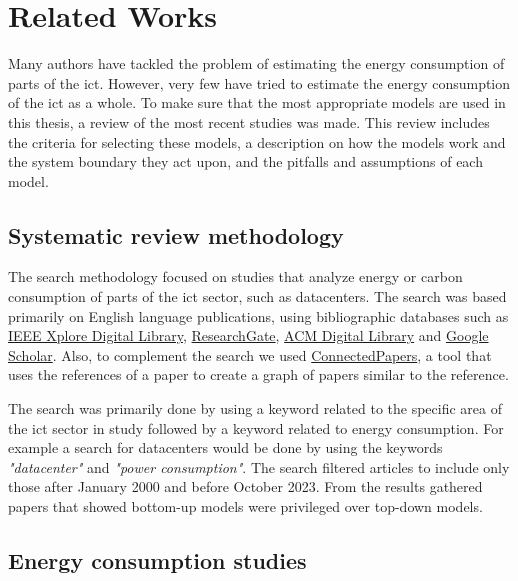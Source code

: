\chapter{Related Works}
\label{chapter:related_works}

\begin{introduction}
    Many authors have tackled the problem of estimating the energy consumption of parts of the \ac{ict}. However, very few have tried to estimate the energy consumption of the \ac{ict} as a whole. To make sure that the most appropriate models are used in this thesis, a review of the most recent studies was made. This review includes the criteria for selecting these models, a description on how the models work and the system boundary they act upon, and the pitfalls and assumptions of each model.
\end{introduction}

\section{Systematic review methodology}

The search methodology focused on studies that analyze energy or carbon consumption of parts of the \ac{ict} sector, such as datacenters. The search was based primarily on English language publications, using bibliographic databases such as \href{https://ieeexplore.ieee.org}{IEEE Xplore Digital Library}, \href{https://www.researchgate.net/}{ResearchGate}, \href{https://dl.acm.org/}{ACM Digital Library} and \href{https://scholar.google.com/}{Google Scholar}. Also, to complement the search we used \href{https://www.connectedpapers.com/}{ConnectedPapers}, a tool that uses the references of a paper to create a graph of papers similar to the reference.

The search was primarily done by using a keyword related to the specific area of the \ac{ict} sector in study followed by a keyword related to energy consumption. For example a search for datacenters would be done by using the keywords \textit{"datacenter"} and \textit{"power consumption"}. The search filtered articles to include only those after January 2000 and before October 2023. 
From the results gathered papers that showed bottom-up models were privileged over top-down models. 

\section{Energy consumption studies}

